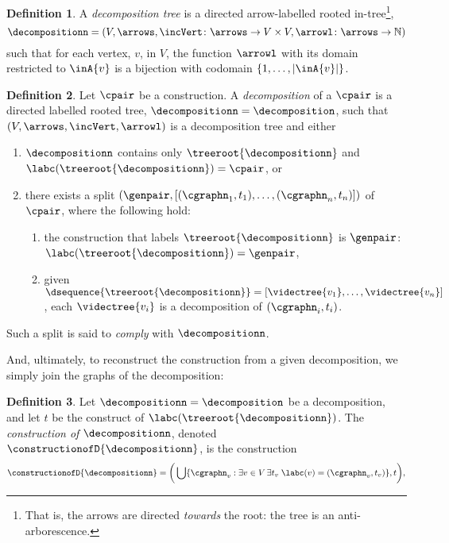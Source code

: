 \documentclass[a4paper]{article}
\theoremstyle{definition}
\newtheorem{definition}{Definition}
\begin{document}
		\begin{definition}\label{defn:decompositionTree}
			A \textit{decomposition tree} is a directed arrow-labelled rooted in-tree\footnote{That is, the arrows are directed \textit{towards} the root: the tree is an anti-arborescence.},
			\begin{displaymath}
			\decompositionn=(V,\arrows, \incVert\colon \arrows\to V\times V, \arrowl\colon \arrows \to \mathbb{N})
			\end{displaymath}
			such that for each vertex, $v$, in $V$, the function $\arrowl$ with its domain restricted to $\inA{v}$ is a bijection with codomain $\{1,\ldots,|\inA{v}|\}$.
		\end{definition}
		\begin{definition}\label{defn:decomposition}
			Let $\cpair$ be a construction. A \textit{decomposition} of a $\cpair$ is a directed labelled rooted tree, $\decompositionn=\decomposition$, such that $(V,\arrows, \incVert, \arrowl)$ is a decomposition tree and either
			\begin{enumerate}[itemsep=0pt,topsep=4pt]
				\item $\decompositionn$ contains only $\treeroot{\decompositionn}$ and $\labc(\treeroot{\decompositionn})=\cpair$, or
				\item there exists a split $(\genpair,[(\cgraphn_1,t_1),\ldots,(\cgraphn_n,t_n)])$ of $\cpair$, where the following hold:
				\begin{enumerate}[itemsep=0pt,topsep=2pt]
					\item the construction that labels $\treeroot{\decompositionn}$ is $\genpair$: $\labc(\treeroot{\decompositionn})=\genpair$,
					\item given $\dsequence{\treeroot{\decompositionn}}=[\videctree{v_1},\ldots,\videctree{v_n}]$, each $\videctree{v_i}$ is a decomposition of $(\cgraphn_i,t_i)$.
				\end{enumerate}
			\end{enumerate}
			Such a split is said to \textit{comply} with $\decompositionn$.
		\end{definition}
	
		And, ultimately, to reconstruct the construction from a given decomposition, we simply join the graphs of the decomposition:
		\begin{definition}\label{defn:constructionOfD}
			Let $\decompositionn=\decomposition$ be a decomposition, and let $t$ be the construct of $\labc(\treeroot{\decompositionn})$. The \textit{construction of} $\decompositionn$, denoted $\constructionofD{\decompositionn}$, is the construction
			\begin{displaymath}
			\constructionofD{\decompositionn}=\bigg(\bigcup \{\cgraphn_v: \exists v\in V \thinspace \exists t_v \thickspace \labc(v)=(\cgraphn_v,t_v)\},t\bigg),
			\end{displaymath}
		\end{definition}
	
\end{document}
